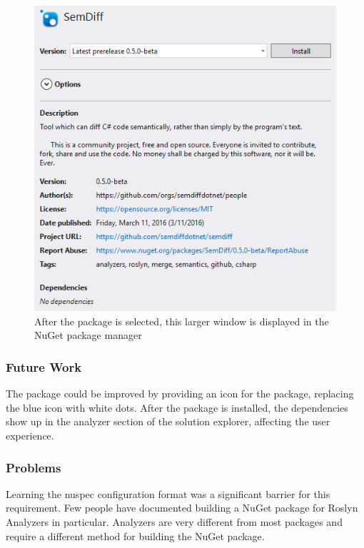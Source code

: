 \documentclass[draftclsnofoot,onecolumn]{IEEEtran}
\begin{document}
\begin{figure}[!htb]
\centering
\includegraphics[scale=.8]{SemDiffInPackageManager}
\caption{After the package is selected, this larger window is displayed in the 
NuGet package manager}
\label{pacman}
\end{figure}

\subsubsection{Future Work}

The package could be improved by providing an icon for the package, replacing 
the blue icon with white dots. After the package is installed, the 
dependencies show up in the analyzer section of the solution explorer, 
affecting the user experience.

\subsubsection{Problems}

Learning the nuspec configuration format was a significant barrier for this 
requirement. Few people have documented building a NuGet package for Roslyn 
Analyzers in particular. Analyzers are very different from most packages and 
require a different method for building the NuGet package. 
\end{document}
